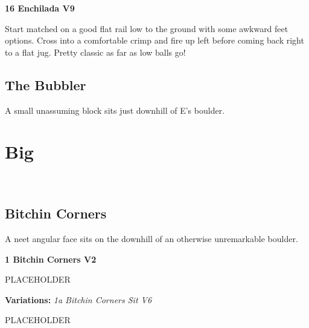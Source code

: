 \begin{multicols*}{2}
					\label{rt:Enchilada}\colorbox{Goldenrod!50}{\textbf{16 Enchilada V9 \ding{72}   }}
					\begin{adjustwidth}{0.5cm}{}
					\begin{minipage}{\linewidth}					
					Start matched on a good flat rail low to the ground with some awkward feet options. Cross into a comfortable crimp and fire up left before coming back right to a flat jug. Pretty classic as far as low balls go!
					\end{minipage}
					\end{adjustwidth}
			\subsection*{The Bubbler}\label{bf:The Bubbler}
			\begin{minipage}{\columnwidth}
			A small unassuming block sits just downhill of E's boulder.
			\end{minipage}
			
		\section{Big}\label{sa:Big}
	\begin{minipage}{\columnwidth}
	\
	\end{minipage}
			\subsection*{Bitchin Corners}\label{bf:Bitchin Corners}
			\begin{minipage}{\columnwidth}
			A neet angular face sits on the downhill of an otherwise unremarkable boulder.
			\end{minipage}
			

					\label{rt:Bitchin Corners}\colorbox{green!20}{\textbf{1 Bitchin Corners V2  }}
					\begin{adjustwidth}{0.5cm}{}
					\begin{minipage}{\linewidth}					
					PLACEHOLDER
					\end{minipage}
						\newline \textbf{Variations:} \newline
							\label{vr:Bitchin Corners Sit}\colorbox{RoyalBlue!20}{\emph{1a Bitchin Corners Sit V6  }}
							\begin{adjustwidth}{0.5cm}{}
							\begin{minipage}{\linewidth}					
							PLACEHOLDER
							\end{minipage}
							\end{adjustwidth}
					\end{adjustwidth}

\end{multicols*}
